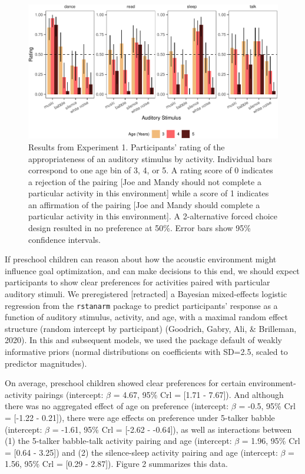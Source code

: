 \documentclass[10pt, letterpaper]{article}
\newenvironment{CodeChunk}{}{}
\begin{document}
\begin{CodeChunk}
\begin{figure}[t]

{\centering \includegraphics{figs/e3b-bar-1} 

}

\caption[Results from Experiment 1]{Results from Experiment 1. Participants' rating of the appropriateness of an auditory stimulus by activity. Individual bars correspond to one age bin of 3, 4, or 5. A rating score of 0 indicates a rejection of the pairing [Joe and Mandy should not complete a particular activity in this environment] while a score of 1 indicates an affirmation of the pairing [Joe and Mandy should complete a particular activity in this environment]. A 2-alternative forced choice design resulted in no preference at 50\%.  Error bars show 95\% confidence intervals.}\label{fig:e3b-bar}
\end{figure}
\end{CodeChunk}

If preschool children can reason about how the acoustic environment
might influence goal optimization, and can make decisions to this end,
we should expect participants to show clear preferences for activities
paired with particular auditory stimuli. We preregistered
{[}retracted{]} a Bayesian mixed-effects logistic regression from the
\texttt{rstanarm} package to predict participants' response as a
function of auditory stimulus, activity, and age, with a maximal random
effect structure (random intercept by participant) (Goodrich, Gabry,
Ali, \& Brilleman, 2020). In this and subsequent models, we used the
package default of weakly informative priors (normal distributions on
coefficients with SD=2.5, scaled to predictor magnitudes).

On average, preschool children showed clear preferences for certain
environment-activity pairings (intercept: \(\beta\) = 4.67, 95\% Crl =
{[}1.71 - 7.67{]}). And although there was no aggregated effect of age
on preference (intercept: \(\beta\) = -0.5, 95\% Crl = {[}-1.22 -
0.21{]}), there were age effects on preference under 5-talker babble
(intercept: \(\beta\) = -1.61, 95\% Crl = {[}-2.62 - -0.64{]}), as well
as interactions between (1) the 5-talker babble-talk activity pairing
and age (intercept: \(\beta\) = 1.96, 95\% Crl = {[}0.64 - 3.25{]}) and
(2) the silence-sleep activity pairing and age (intercept: \(\beta\) =
1.56, 95\% Crl = {[}0.29 - 2.87{]}). Figure 2 summarizes this data.
\end{document}
